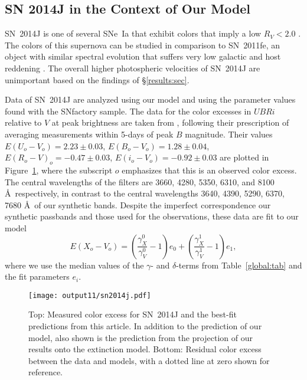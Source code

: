 \documentclass{aastex61}   	%
\begin{document}
\subsection{SN 2014J in the Context of Our Model}
\label{sn2014j:sec}
SN~2014J   is one of several SNe~Ia that exhibit colors that imply a low $R_V<2.0$ \citep{2014ApJ...788L..21A, 2014MNRAS.443.2887F, 
2014arXiv1411.3332J,
2014ApJ...795L...4K, 2015ApJ...805...74B}.
The colors of this supernova can be studied in comparison to SN~2011fe, an object with similar
spectral evolution that 
suffers very low galactic and host reddening
\citep[this technique has been used in][]{2006MNRAS.369.1880E,2007AJ....133...58K,2008MNRAS.384..107E,2010AJ....139..120F, 2014ApJ...788L..21A,
2017arXiv170101422H}.
The overall higher photospheric velocities of
SN~2014J are unimportant  based on the findings of  \S\ref{results:sec}.

Data of SN~2014J are  analyzed using our model and using the parameter values found with the SNfactory sample.
The data for the color excesses  in $UBRi$  relative to $V$ at peak brightness  are taken from \citet{2014ApJ...788L..21A},
following their prescription of averaging measurements within 5-days of peak $B$ magnitude.
Their values 
$E(U_o-V_o) =   2.23 \pm   0.03$,
$E(B_o-V_o) =   1.28 \pm   0.04$,
$E(R_o-V)_o =  -0.47 \pm   0.03$,
$E(i_o-V_o) =  -0.92 \pm   0.03$
are plotted in Figure~\ref{sn2014j:fig}, where the subscript $o$ emphasizes that this is an observed color excess.
The central wavelengths of the filters are 3660, 4280, 5350, 6310, and 8100 \AA\ respectively, in contrast to the central
wavelengths 
3640, 4390, 5290, 6370, 7680 \AA\ of our synthetic bands.  Despite the imperfect correspondence our synthetic passbands
and those used for the observations,
these data are fit to our model
\begin{equation}
E(X_o-V_o) =  \left(\frac{\gamma^0_X}{\gamma^0_V}-1\right)e_0 +  \left(\frac{\gamma^1_X}{\gamma^1_V}-1\right)e_1,
\end{equation}
where we use the median values of the $\gamma$- and $\delta$-terms from Table~\ref{global:tab} and the fit
parameters $e_i $.

\begin{figure}[htbp] %
   \centering
   \texttt{[image: output11/sn2014j.pdf]} 
   \caption{Top: Measured color excess for SN~2014J and the best-fit predictions from this article.
   \color{purple}
   In addition to the prediction
   of our model, also shown is the prediction from the projection
   of our results onto the  extinction model.  Bottom: Residual color excess
   between the data and models, with a dotted line at zero shown for reference.
   \color{black}
   \label{sn2014j:fig}}
\end{figure}
\end{document}
